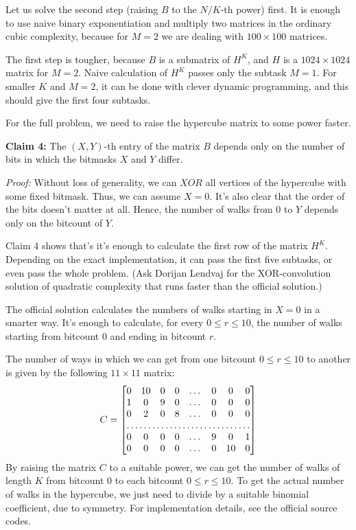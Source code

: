Let us solve the second step (raising $B$ to the $N/K$-th power) first.
It is enough to use naive binary exponentiation and multiply two matrices
in the ordinary cubic complexity, because for $M=2$ we are dealing with $100
\times 100$ matrices.

The first step is tougher, because $B$ is a submatrix of $H^K$, and $H$ is a
$1024 \times 1024$ matrix for $M=2$. Naive calculation of $H^K$ passes only the
subtask $M=1$. For smaller $K$ and $M=2$, it can be done with clever dynamic
programming, and this should give the first four subtasks.

For the full problem, we need to raise the hypercube matrix to some power
faster.

\textbf{Claim 4:} The $(X, Y)$-th entry of the matrix $B$ depends only on the
number of bits in which the bitmasks $X$ and $Y$ differ.

\textit{Proof:} Without loss of generality, we can $XOR$ all vertices of the
hypercube with some fixed bitmask. Thus, we can assume $X = 0$.
It's also clear that the order of the bits doesn't matter at all.
Hence, the number of walks from $0$ to $Y$ depends only on the bitcount of $Y$.

Claim 4 shows that's it's enough to calculate the first row of the matrix $H^K$.
Depending on the exact implementation, it can pass the first five subtasks, or
even pass the whole problem. (Ask Dorijan Lendvaj for the XOR-convolution 
solution of quadratic complexity that runs faster than the official solution.)

The official solution calculates the numbers of walks starting in $X=0$ 
in a smarter way. It's enough to calculate, for every $0 \le r \le 10$,
 the number of walks starting from bitcount $0$ and ending in bitcount $r$.

The number of ways in which we can get from one bitcount $0 \le r \le 10$ to
another is given by the following $11 \times 11$ matrix:
\[
  C =
\begin{bmatrix}
  0       & 10 & 0 & 0 & \dots  & 0 & 0 & 0 \\
    1       & 0 & 9 & 0 & \dots & 0 & 0 & 0 \\
    0       & 2 & 0 & 8 & \dots & 0 & 0 & 0 \\
    \hdotsfor{8} \\
    0       & 0 & 0 & 0 & \dots & 9 & 0 & 1 \\
    0       & 0 & 0 & 0 & \dots & 0 & 10 & 0 \\
\end{bmatrix}
\]
By raising the matrix $C$ to a suitable power, we can get the number of walks of
length $K$ from bitcount $0$ to each bitcount $0 \le r \le 10$.
To get the actual number of walks in the hypercube, we just need to divide by a
suitable binomial coefficient, due to symmetry.
For implementation details, see the official source codes.

